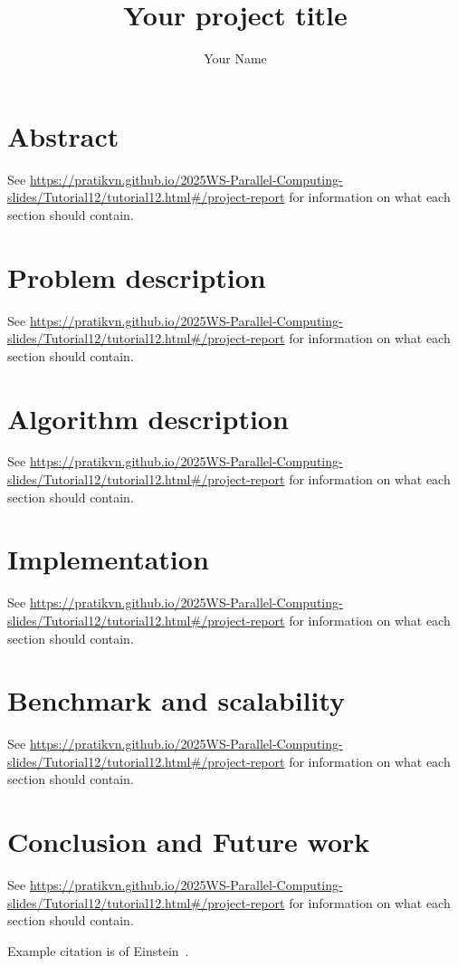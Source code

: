 \documentclass[11pt, a4paper]{article}
\title{Your project title}
\author{Your Name}
\date{}
\begin{document}
\maketitle

\section{Abstract}

See \url{https://pratikvn.github.io/2025WS-Parallel-Computing-slides/Tutorial12/tutorial12.html#/project-report} for information on what each section should contain.
\section{Problem description}
See \url{https://pratikvn.github.io/2025WS-Parallel-Computing-slides/Tutorial12/tutorial12.html#/project-report} for information on what each section should contain.
\section{Algorithm description}
See \url{https://pratikvn.github.io/2025WS-Parallel-Computing-slides/Tutorial12/tutorial12.html#/project-report} for information on what each section should contain.
\section{Implementation}
See \url{https://pratikvn.github.io/2025WS-Parallel-Computing-slides/Tutorial12/tutorial12.html#/project-report} for information on what each section should contain.
\section{Benchmark and scalability}
See \url{https://pratikvn.github.io/2025WS-Parallel-Computing-slides/Tutorial12/tutorial12.html#/project-report} for information on what each section should contain.
\section{Conclusion and Future work}
See \url{https://pratikvn.github.io/2025WS-Parallel-Computing-slides/Tutorial12/tutorial12.html#/project-report} for information on what each section should contain.

Example citation is of Einstein~\cite{einstein}.

\printbibliography
\end{document}
